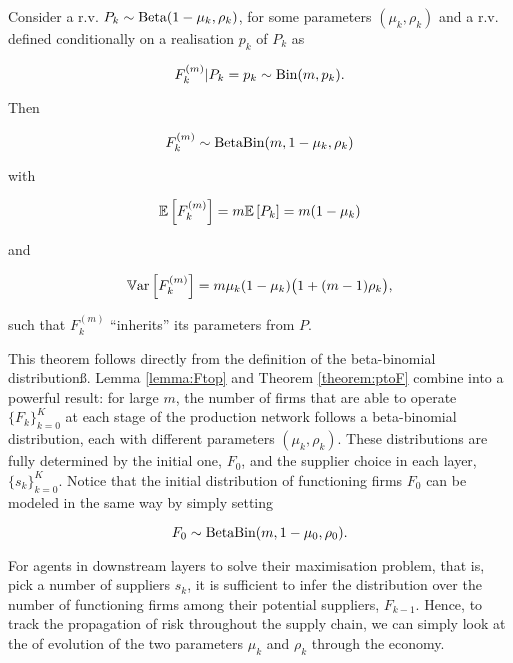 \documentclass[../../main.tex]{subfiles}
\begin{document}
\begin{theorem} \label{theorem:ptoF}
  Consider a r.v. $P_k \sim \text{Beta}(1 - \mu_k, \rho_k)$, for some parameters $(\mu_k, \rho_k)$ and a r.v. defined conditionally on a realisation $p_k$ of $P_k$ as 
  
  \begin{equation}
    F^{(m)}_k \vert P_k = p_k \sim \text{Bin}(m, p_k).
  \end{equation}

  Then

  \begin{equation}
    F^{(m)}_k \sim \text{Beta}\text{Bin}(m, 1 - \mu_k, \rho_k)
  \end{equation}

  with

  \begin{equation} \label{eq:mean_of_F}
    \mathbb{E} \left[F^{(m)}_k\right] = m \mathbb{E} \left[P_k\right] = m (1 - \mu_k)
  \end{equation}

  and 

  \begin{equation} \label{eq:var_of_F}
    \mathbb{V}\text{ar} \left[F^{(m)}_k\right] = m \mu_k (1 - \mu_k) \big(1 + (m - 1) \rho_k\big),
  \end{equation}

  such that $F^{(m)}_k$ ``inherits'' its parameters from $P$.
\end{theorem}

This theorem follows directly from the definition of the beta-binomial distributionß. Lemma \ref*{lemma:Ftop} and Theorem \ref*{theorem:ptoF} combine into a powerful result: for large $m$, the number of firms that are able to operate $\{F_k\}^{K}_{k = 0}$ at each stage of the production network follows a beta-binomial distribution, each with different parameters $(\mu_k, \rho_k)$. These distributions are fully determined by the initial one, $F_0$, and the supplier choice in each layer, $\{s_k\}^{K}_{k = 0}$. Notice that the initial distribution of functioning firms $F_0$ can be modeled in the same way by simply setting 

\begin{equation}
  F_0 \sim \text{Beta}\text{Bin}(m, 1 - \mu_0, \rho_0).
\end{equation}


For agents in downstream layers to solve their maximisation problem, that is, pick a number of suppliers $s_k$, it is sufficient to infer the distribution over the number of functioning firms among their potential suppliers, $F_{k - 1}$. Hence, to track the propagation of risk throughout the supply chain, we can simply look at the of evolution of the two parameters $\mu_k$ and $\rho_k$ through the economy.
\end{document}
